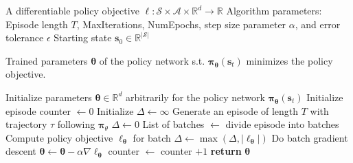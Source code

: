 \begin{algorithm}[H]
\caption{DEQN policy iteration for estimating \(\pi\approx \pi^*\)}
\label{algo:DEQN_policy_iteration}
\begin{algorithmic}[1] %
    \Require
    \Statex A differentiable policy objective $\ell: \mathcal{S} \times \mathcal{A} \times \mathbb{R}^d \rightarrow \mathbb{R}$
    \Statex Algorithm parameters: Episode length $T$, MaxIterations, NumEpochs, step size parameter $\alpha$, and error tolerance $\epsilon$
    \Statex Starting state $\bm{s}_0 \in \mathbb{R}^{|\mathcal{S}|}$
    \Statex 
    
    \Ensure
    \Statex Trained parameters $\bm{\theta}$ of the policy network s.t. $\bm{\pi_\theta}(\bm{s}_t)$ minimizes the policy objective. 
    \Statex

    \State Initialize parameters $\bm{\theta}\in \mathbb{R}^d$ arbitrarily for the policy network $\bm{\pi_{\theta}}(\bm{s}_t)$
    \State Initialize episode counter $\gets 0$
    \State Initialize $\Delta \gets \infty$
    \Statex
        \State Generate an episode of length $T$ with trajectory $\tau$ following $\bm{\pi}_\theta$
        \State $\Delta \gets 0$
            \State List of batches $\gets$ divide episode into batches
                \State Compute policy objective $\ell_{\bm{\theta}}$ for batch
                \State $\Delta \gets \max (\Delta, |\ell_{\bm{\theta}}|)$
                \State Do batch gradient descent $\bm{\theta} \gets \bm{\theta} - \alpha \nabla\ell_{\bm{\theta}}$            
            \EndFor
        \EndFor
        \State counter $\gets$ counter $+ 1$
    \EndWhile
    \State \textbf{return} $\bm{\theta}$
\end{algorithmic}
\end{algorithm}
